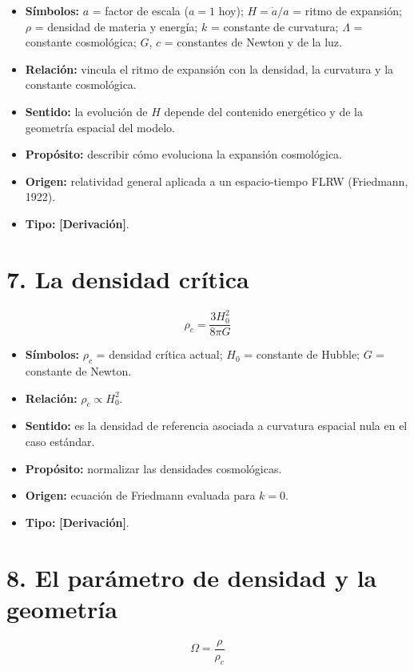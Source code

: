\begin{itemize}
  \item \textbf{Símbolos:} $a$ = factor de escala ($a=1$ hoy); $H=\dot a/a$ = ritmo de expansión; $\rho$ = densidad de materia y energía; $k$ = constante de curvatura; $\Lambda$ = constante cosmológica; $G$, $c$ = constantes de Newton y de la luz.
  \item \textbf{Relación:} vincula el ritmo de expansión con la densidad, la curvatura y la constante cosmológica.
  \item \textbf{Sentido:} la evolución de $H$ depende del contenido energético y de la geometría espacial del modelo.
  \item \textbf{Propósito:} describir cómo evoluciona la expansión cosmológica.
  \item \textbf{Origen:} relatividad general aplicada a un espacio-tiempo FLRW (Friedmann, 1922).
  \item \textbf{Tipo:} \textbf{[Derivación]}.
\end{itemize}

\section*{7. La densidad crítica}

\[ \rho_{c} = \frac{3H_{0}^{2}}{8\pi G} \]

\begin{itemize}
  \item \textbf{Símbolos:} $\rho_c$ = densidad crítica actual; $H_0$ = constante de Hubble; $G$ = constante de Newton.
  \item \textbf{Relación:} $\rho_c\propto H_0^2$.
  \item \textbf{Sentido:} es la densidad de referencia asociada a curvatura espacial nula en el caso estándar.
  \item \textbf{Propósito:} normalizar las densidades cosmológicas.
  \item \textbf{Origen:} ecuación de Friedmann evaluada para $k=0$.
  \item \textbf{Tipo:} \textbf{[Derivación]}.
\end{itemize}

\section*{8. El parámetro de densidad y la geometría}

\[ \Omega=\frac{\rho}{\rho_{c}} \]

